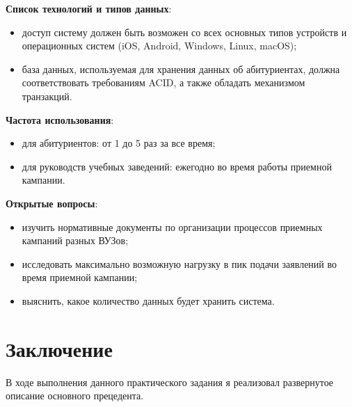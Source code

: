 \documentclass[a4paper, 14pt]{extarticle}
\begin{document}
{  \textbf{Список технологий и типов данных}:
  \begin{itemize}
    \item доступ систему должен быть возможен со всех основных типов устройств и
    операционных систем (iOS, Android, Windows, Linux, macOS);
    \item база данных, используемая для хранения данных об абитуриентах, должна
    соответствовать требованиям ACID, а также обладать механизмом транзакций.
  \end{itemize}

  \textbf{Частота использования}:
  \begin{itemize}
    \item для абитуриентов: от 1 до 5 раз за все время;
    \item для руководств учебных заведений: ежегодно во время работы приемной
    кампании.
  \end{itemize}

  \textbf{Открытые вопросы}:
  \begin{itemize}
    \item изучить нормативные документы по организации процессов приемных
    кампаний разных ВУЗов;
    \item исследовать максимально возможную нагрузку в пик подачи заявлений во
    время приемной кампании;
    \item выяснить, какое количество данных будет хранить система.
  \end{itemize}
}

\section{Заключение}

В ходе выполнения данного практического задания я реализовал развернутое
описание основного прецедента.
\end{document}
